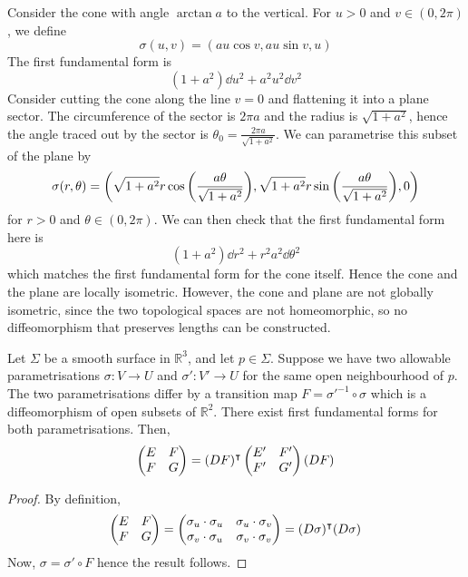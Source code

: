 \begin{example}
	Consider the cone with angle \( \arctan a \) to the vertical.
	For \( u > 0 \) and \( v \in (0,2\pi) \), we define
	\[ \sigma(u,v) = (au\cos v, au\sin v, u) \]
	The first fundamental form is
	\[ (1+a^2)\dd{u}^2 + a^2 u^2 \dd{v}^2 \]
	Consider cutting the cone along the line \( v = 0 \) and flattening it into a plane sector.
	The circumference of the sector is \( 2 \pi a \) and the radius is \( \sqrt{1+a^2} \), hence the angle traced out by the sector is \( \theta_0 = \frac{2 \pi a}{\sqrt{1+a^2}} \).
	We can parametrise this subset of the plane by
	\[ \sigma(r,\theta) = \qty(\sqrt{1+a^2} r\cos\qty(\frac{a\theta}{\sqrt{1+a^2}}), \sqrt{1+a^2} r\sin\qty(\frac{a\theta}{\sqrt{1+a^2}}), 0) \]
	for \( r > 0 \) and \( \theta \in (0,2\pi) \).
	We can then check that the first fundamental form here is
	\[ (1+a^2) \dd{r}^2 + r^2 a^2 \dd{\theta}^2 \]
	which matches the first fundamental form for the cone itself.
	Hence the cone and the plane are locally isometric.
	However, the cone and plane are not globally isometric, since the two topological spaces are not homeomorphic, so no diffeomorphism that preserves lengths can be constructed.
\end{example}
\begin{lemma}
	Let \( \Sigma \) be a smooth surface in \( \mathbb R^3 \), and let \( p \in \Sigma \).
	Suppose we have two allowable parametrisations \( \sigma \colon V \to U \) and \( \sigma' \colon V' \to U \) for the same open neighbourhood of \( p \).
	The two parametrisations differ by a transition map \( F = {\sigma'}^{-1} \circ \sigma \) which is a diffeomorphism of open subsets of \( \mathbb R^2 \).
	There exist first fundamental forms for both parametrisations.
	Then,
	\[ \begin{pmatrix}
		E & F \\
		F & G
	\end{pmatrix} = (DF)^\intercal \begin{pmatrix}
		E' & F' \\
		F' & G'
	\end{pmatrix} (DF) \]
\end{lemma}
\begin{proof}
	By definition,
	\[ \begin{pmatrix}
		E & F \\
		F & G
	\end{pmatrix} = \begin{pmatrix}
		\sigma_u \cdot \sigma_u & \sigma_u \cdot \sigma_v \\
		\sigma_v \cdot \sigma_u & \sigma_v \cdot \sigma_v
	\end{pmatrix} = (D\sigma)^\intercal (D\sigma) \]
	Now, \( \sigma = \sigma' \circ F \) hence the result follows.
\end{proof}


